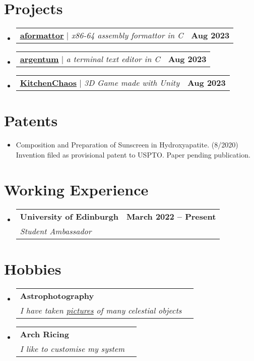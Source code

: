 \documentclass[letterpaper,11pt]{article}
\makeatletter
\newcommand{\resumeItem}[1]{
  \item\small{
    {#1 \vspace{-2pt}}
  }
}
\newcommand{\resumeSubheading}[4]{
  \vspace{-2pt}\item
    \begin{tabular*}{1.0\textwidth}[t]{l@{\extracolsep{\fill}}r}
      \textbf{#1} & \textbf{\small #2} \\
      \textit{\small#3} & \textit{\small #4} \\
    \end{tabular*}\vspace{-7pt}
}
\newcommand{\resumeProjectHeading}[2]{
    \item
    \begin{tabular*}{1.001\textwidth}{l@{\extracolsep{\fill}}r}
      \small#1 & \textbf{\small #2}\\
    \end{tabular*}\vspace{-7pt}
}
\newcommand{\resumeSubHeadingListStart}{\begin{itemize}[leftmargin=0.0in, label={}]}
\newcommand{\resumeSubHeadingListEnd}{\end{itemize}}
\newcommand{\resumeItemListStart}{\begin{itemize}}
\newcommand{\resumeItemListEnd}{\end{itemize}\vspace{-5pt}}
\makeatother
\begin{document}
\section{Projects}
    \vspace{-5pt}
    \resumeSubHeadingListStart
    \resumeProjectHeading 
    {
    \href{https://github.com/harryhanYuhao/aformattor.git}{\underline{\textbf{aformattor}}} 
    $|$ \emph{x86-64 assembly formattor in C} 
    }{Aug 2023}

    \vspace{-30pt}
    \resumeProjectHeading 
    {
    \href{https://github.com/harryhanYuhao/argentum.git}{\underline{\textbf{argentum}}} 
    $|$ \emph{a terminal text editor in C} 
    }{Aug 2023}

    \vspace{-30pt}
    \resumeProjectHeading 
    {
    \href{https://github.com/harryhanYuhao/kitchenChaos.git}{\underline{\textbf{KitchenChaos}}} 
    $|$ \emph{3D Game made with Unity}
    }{Aug 2023}

   \resumeSubHeadingListEnd


%
\section{Patents}
\resumeItemListStart
\resumeItem{Composition and Preparation of Sunscreen in Hydroxyapatite. (8/2020) Invention filed as provisional patent to USPTO. Paper pending publication.}
\resumeItemListEnd

\section{Working Experience}
  \resumeSubHeadingListStart
    \resumeSubheading
      {University of Edinburgh}{March 2022 -- Present}
      {Student Ambassador}{}
  \resumeSubHeadingListEnd

\section{Hobbies}
    \resumeSubHeadingListStart
    \resumeSubheading{Astrophotography}{}{I have taken \href{https://telescopius.com/profile/yuhao_han}{\underline{pictures}} of many celestial objects}{}
    \resumeSubheading{Arch Ricing}{}{I like to customise my system}{}
    \resumeSubHeadingListEnd
\end{document}
